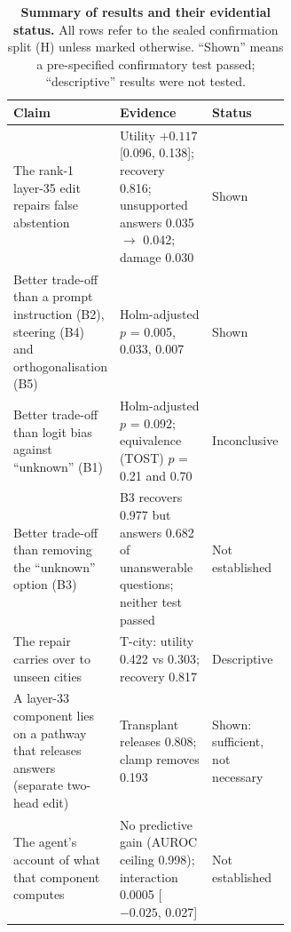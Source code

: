 \begin{table}[H]
\centering\footnotesize\renewcommand{\arraystretch}{1.05}\setlength{\tabcolsep}{4pt}
\caption*{\textbf{Summary of results and their evidential status.} All rows refer to the sealed confirmation split
(H) unless marked otherwise. ``Shown'' means a pre-specified confirmatory test passed; ``descriptive'' results were
not tested.}
\begin{tabularx}{\linewidth}{@{}YL{0.47\linewidth}L{0.15\linewidth}@{}}
\toprule
Claim & Evidence & Status \\
\midrule
The rank-1 layer-35 edit repairs false abstention &
Utility $+0.117$ [0.096, 0.138]; recovery 0.816; unsupported answers 0.035 $\to$ 0.042; damage 0.030 &
Shown \\
Better trade-off than a prompt instruction (B2), steering (B4) and orthogonalisation (B5) &
Holm-adjusted $p$ = 0.005, 0.033, 0.007 &
Shown \\
Better trade-off than logit bias against ``unknown'' (B1) &
Holm-adjusted $p$ = 0.092; equivalence (TOST) $p$ = 0.21 and 0.70 &
Inconclusive \\
Better trade-off than removing the ``unknown'' option (B3) &
B3 recovers 0.977 but answers 0.682 of unanswerable questions; neither test passed &
Not established \\
The repair carries over to unseen cities &
T-city: utility 0.422 vs 0.303; recovery 0.817 &
Descriptive \\
A layer-33 component lies on a pathway that releases answers (separate two-head edit) &
Transplant releases 0.808; clamp removes 0.193 &
Shown: sufficient, not necessary \\
The agent's account of what that component computes &
No predictive gain (AUROC ceiling 0.998); interaction 0.0005 [$-0.025$, 0.027] &
Not established \\
\bottomrule
\end{tabularx}
\end{table}
